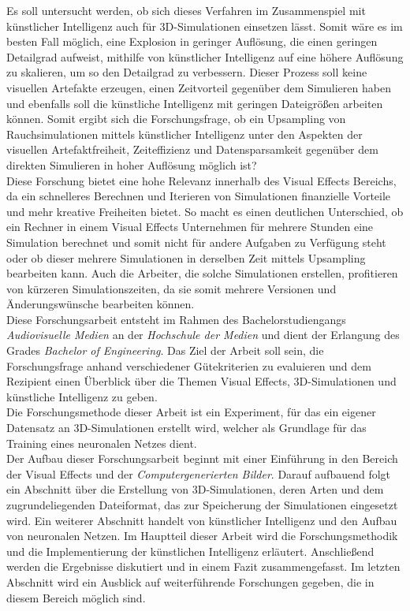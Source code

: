 Es soll untersucht werden, ob sich dieses Verfahren im Zusammenspiel mit künstlicher Intelligenz auch für 3D-Simulationen einsetzen lässt. Somit wäre es im besten Fall möglich, eine Explosion in geringer Auflösung, die einen geringen Detailgrad aufweist, mithilfe von künstlicher Intelligenz auf eine höhere Auflösung zu skalieren, um so den Detailgrad zu verbessern. Dieser Prozess soll keine visuellen Artefakte erzeugen, einen Zeitvorteil gegenüber dem Simulieren haben und ebenfalls soll die künstliche Intelligenz mit geringen Dateigrößen arbeiten können. Somit ergibt sich die Forschungsfrage, ob ein Upsampling von Rauchsimulationen mittels künstlicher Intelligenz unter den Aspekten der visuellen Artefaktfreiheit, Zeiteffizienz und Datensparsamkeit gegenüber dem direkten Simulieren in hoher Auflösung möglich ist?\\

Diese Forschung bietet eine hohe Relevanz innerhalb des Visual Effects Bereichs, da ein schnelleres Berechnen und Iterieren von Simulationen finanzielle Vorteile und mehr kreative Freiheiten bietet. So macht es einen deutlichen Unterschied, ob ein Rechner in einem Visual Effects Unternehmen für mehrere Stunden eine Simulation berechnet und somit nicht für andere Aufgaben zu Verfügung steht oder ob dieser mehrere Simulationen in derselben Zeit mittels Upsampling bearbeiten kann. Auch die Arbeiter, die solche Simulationen erstellen, profitieren von kürzeren Simulationszeiten, da sie somit mehrere Versionen und Änderungswünsche bearbeiten können.\\

Diese Forschungsarbeit entsteht im Rahmen des Bachelorstudiengangs \textit{Audiovisuelle Medien} an der \textit{Hochschule der Medien} und dient der Erlangung des Grades \textit{Bachelor of Engineering}.
Das Ziel der Arbeit soll sein, die Forschungsfrage anhand verschiedener Gütekriterien zu evaluieren und dem Rezipient einen Überblick über die Themen Visual Effects, 3D-Simulationen und künstliche Intelligenz zu geben. \\

Die Forschungsmethode dieser Arbeit ist ein Experiment, für das ein eigener Datensatz an 3D-Simulationen erstellt wird, welcher als Grundlage für das Training eines neuronalen Netzes dient.\\

Der Aufbau dieser Forschungsarbeit beginnt mit einer Einführung in den Bereich der Visual Effects und der \textit{Computergenerierten Bilder}. Darauf aufbauend folgt ein Abschnitt über die Erstellung von 3D-Simulationen, deren Arten und dem zugrundeliegenden Dateiformat, das zur Speicherung der Simulationen eingesetzt wird. Ein weiterer Abschnitt handelt von künstlicher Intelligenz und den Aufbau von neuronalen Netzen. Im Hauptteil dieser Arbeit wird die Forschungsmethodik und die Implementierung der künstlichen Intelligenz erläutert. Anschließend werden die Ergebnisse diskutiert und in einem Fazit zusammengefasst. Im letzten Abschnitt wird ein Ausblick auf weiterführende Forschungen gegeben, die in diesem Bereich möglich sind.  

